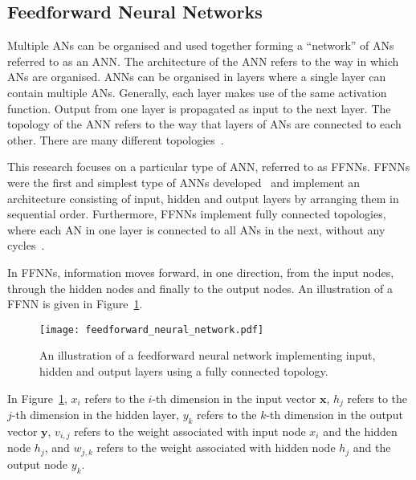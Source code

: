 \subsection{Feedforward Neural Networks}
\label{sec:anns:ffnn}

Multiple \acp{AN} can be organised and used together forming a ``network'' of \acp{AN} referred to as an \acf{ANN}. The architecture of the \acs{ANN} refers to the way in which \acp{AN} are organised. \acp{ANN} can be organised in layers where a single layer can contain multiple \acp{AN}. Generally, each layer makes use of the same activation function. Output from one layer is propagated as input to the next layer. The topology of the \acs{ANN} refers to the way that layers of \acp{AN} are connected to each other. There are many different topologies~\cite{ref:miikkulainen:2010}.

This research focuses on a particular type of \acs{ANN}, referred to as \acp{FFNN}. \acp{FFNN} were the first and simplest type of \acp{ANN} developed~\cite{ref:schmidhuber:2015} and implement an architecture consisting of input, hidden and output layers by arranging them in sequential order. Furthermore, \acp{FFNN} implement fully connected topologies, where each \acs{AN} in one layer is connected to all \acp{AN} in the next, without any cycles~\cite{ref:zell:1994}.

In \acp{FFNN}, information moves forward, in one direction, from the input nodes, through the hidden nodes and finally to the output nodes. An illustration of a \acs{FFNN} is given in Figure~\ref{fig:ffnn}.

\begin{figure}[htb]
	\centering
	\texttt{[image: feedforward\_neural\_network.pdf]}
	\caption[A feedforward neural network]{An illustration of a feedforward neural network implementing input, hidden and output layers using a fully connected topology.}
	\label{fig:ffnn}
\end{figure}

In Figure~\ref{fig:ffnn}, $x_i$ refers to the $i$-th dimension in the input vector $\boldsymbol{x}$, $h_j$ refers to the $j$-th dimension in the hidden layer, $y_k$ refers to the $k$-th dimension in the output vector $\boldsymbol{y}$, $v_{i,j}$ refers to the weight associated with input node $x_i$ and the hidden node $h_j$, and $w_{j,k}$ refers to the weight associated with hidden node $h_j$ and the output node $y_k$.


